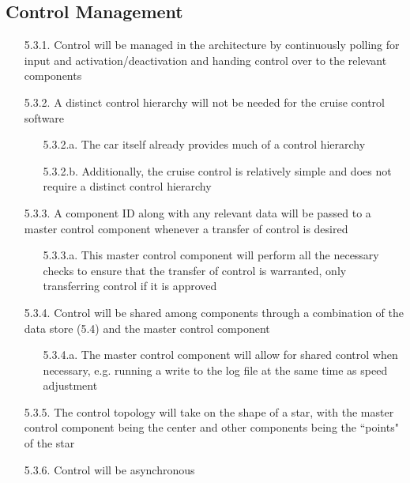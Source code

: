 \documentclass{article}
\begin{document}
	\subsection{Control Management}
	\begin{enumerate}
		\item[5.3.1.] Control will be managed in the architecture by continuously polling for input and activation/deactivation and handing control over to the relevant components
		\item[5.3.2.] A distinct control hierarchy will not be needed for the cruise control software
		\begin{enumerate}
			\item[5.3.2.a.] The car itself already provides much of a control hierarchy
			\item[5.3.2.b.] Additionally, the cruise control is relatively simple and does not require a distinct control hierarchy
		\end{enumerate}
		\item[5.3.3.] A component ID along with any relevant data will be passed to a master control component whenever a transfer of control is desired
		\begin{enumerate}
			\item[5.3.3.a.] This master control component will perform all the necessary checks to ensure that the transfer of control is warranted, only transferring control if it is approved
		\end{enumerate}
		\item[5.3.4.] Control will be shared among components through a combination of the data store (5.4) and the master control component
		\begin{enumerate}
			\item[5.3.4.a.] The master control component will allow for shared control when necessary, e.g. running a write to the log file at the same time as speed adjustment
		\end{enumerate}
		\item[5.3.5.] The control topology will take on the shape of a star, with the master control component being the center and other components being the ``points" of the star
		\item[5.3.6.] Control will be asynchronous
	\end{enumerate}
	
\end{document}

